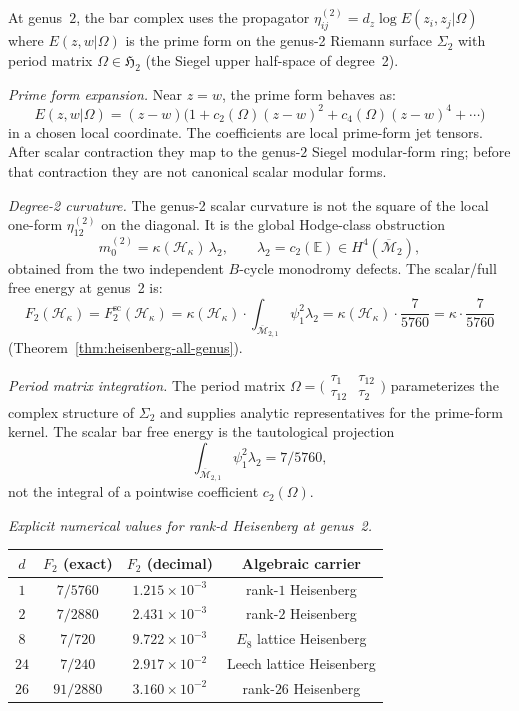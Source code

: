 \begin{computation}
\label{comp:heisenberg-genus2-period}

At genus~$2$, the bar complex uses the propagator
$\eta_{ij}^{(2)} = d_z \log E(z_i, z_j|\Omega)$ where
$E(z,w|\Omega)$ is the prime form on the genus-2 Riemann surface
$\Sigma_2$ with period matrix $\Omega \in \mathfrak{H}_2$ (the
Siegel upper half-space of degree~2).

\emph{Prime form expansion.}
Near $z = w$, the prime form behaves as:
\[
E(z,w|\Omega) = (z-w)\bigl(1 + c_2(\Omega)(z-w)^2
+ c_4(\Omega)(z-w)^4 + \cdots\bigr)
\]
in a chosen local coordinate. The coefficients are local prime-form
jet tensors. After scalar contraction they map to the genus-$2$
Siegel modular-form ring; before that contraction they are not
canonical scalar modular forms.

\emph{Degree-2 curvature.}
The genus-2 scalar curvature is not the square of the local
one-form $\eta_{12}^{(2)}$ on the diagonal. It is the global
Hodge-class obstruction
\[
m_0^{(2)}=\kappa(\mathcal H_\kappa)\,\lambda_2,
\qquad
\lambda_2=c_2(\mathbb E)\in H^4(\overline{\mathcal M}_2),
\]
obtained from the two independent $B$-cycle monodromy defects.
The scalar/full free energy at genus~2 is:
\[
F_2(\mathcal{H}_\kappa)=F_2^{\mathrm{sc}}(\mathcal{H}_\kappa)
 = \kappa(\mathcal H_\kappa)
   \cdot \int_{\overline{\mathcal{M}}_{2,1}}\psi_1^2 \lambda_2
 = \kappa(\mathcal H_\kappa)\cdot \frac{7}{5760}
 = \kappa\cdot \frac{7}{5760}
\]
(Theorem~\ref{thm:heisenberg-all-genus}).

\emph{Period matrix integration.}
The period matrix
$\Omega = \bigl(\begin{smallmatrix} \tau_1 & \tau_{12} \\
\tau_{12} & \tau_2 \end{smallmatrix}\bigr)$ parameterizes the
complex structure of $\Sigma_2$ and supplies analytic representatives
for the prime-form kernel. The scalar bar free energy is the
tautological projection
\[
\int_{\overline{\mathcal{M}}_{2,1}}\psi_1^2\lambda_2=7/5760,
\]
not the integral of a pointwise coefficient $c_2(\Omega)$.

\emph{Explicit numerical values for rank-$d$ Heisenberg at genus~2.}
\begin{center}
\renewcommand{\arraystretch}{1.2}
\begin{tabular}{c|ccc}
$d$ & $F_2$ (exact) & $F_2$ (decimal) & Algebraic carrier \\
\hline
$1$ & $7/5760$ & $1.215 \times 10^{-3}$ & rank-$1$ Heisenberg \\
$2$ & $7/2880$ & $2.431 \times 10^{-3}$ & rank-$2$ Heisenberg \\
$8$ & $7/720$ & $9.722 \times 10^{-3}$ & $E_8$ lattice Heisenberg \\
$24$ & $7/240$ & $2.917 \times 10^{-2}$ & Leech lattice Heisenberg \\
$26$ & $91/2880$ & $3.160 \times 10^{-2}$ & rank-$26$ Heisenberg
\end{tabular}
\end{center}
\end{computation}


